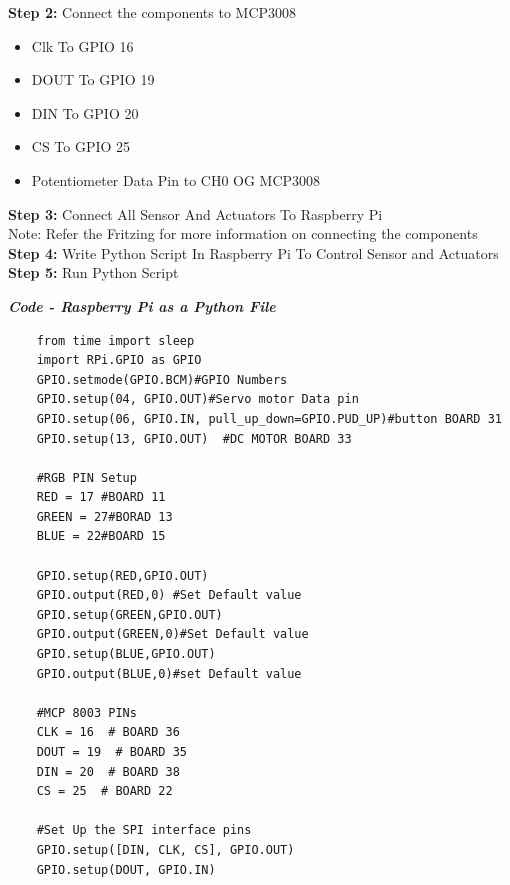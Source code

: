 \documentclass[12pt,a4paper]{article}
\begin{document}
\begin{flushleft}
\textbf{Step 2:} Connect the components to MCP3008
\begin{itemize}[noitemsep,nolistsep]
\item Clk To GPIO 16
\item DOUT To GPIO 19
\item DIN To GPIO 20
\item CS To GPIO 25
\item Potentiometer Data Pin to CH0 OG MCP3008
\end{itemize}
\vspace{5mm}

\textbf{Step 3:} Connect All Sensor And Actuators To Raspberry Pi\\
Note: Refer the Fritzing for more information on connecting the components \\\vspace{5mm}
\textbf{Step 4:} Write Python Script In Raspberry Pi To Control Sensor and Actuators \\\vspace{5mm}
\textbf{Step 5:} Run Python Script
\vspace{5mm}

\textbf{\textit{Code - Raspberry Pi as a Python File}}
\begin{lstlisting}
    from time import sleep
    import RPi.GPIO as GPIO
    GPIO.setmode(GPIO.BCM)#GPIO Numbers
    GPIO.setup(04, GPIO.OUT)#Servo motor Data pin
    GPIO.setup(06, GPIO.IN, pull_up_down=GPIO.PUD_UP)#button BOARD 31
    GPIO.setup(13, GPIO.OUT)  #DC MOTOR BOARD 33

    #RGB PIN Setup
    RED = 17 #BOARD 11
    GREEN = 27#BORAD 13
    BLUE = 22#BOARD 15

    GPIO.setup(RED,GPIO.OUT)
    GPIO.output(RED,0) #Set Default value
    GPIO.setup(GREEN,GPIO.OUT)
    GPIO.output(GREEN,0)#Set Default value
    GPIO.setup(BLUE,GPIO.OUT)
    GPIO.output(BLUE,0)#set Default value

    #MCP 8003 PINs
    CLK = 16  # BOARD 36
    DOUT = 19  # BOARD 35
    DIN = 20  # BOARD 38
    CS = 25  # BOARD 22

    #Set Up the SPI interface pins
    GPIO.setup([DIN, CLK, CS], GPIO.OUT)
    GPIO.setup(DOUT, GPIO.IN)


\end{lstlisting}
\end{flushleft}
\end{document}
